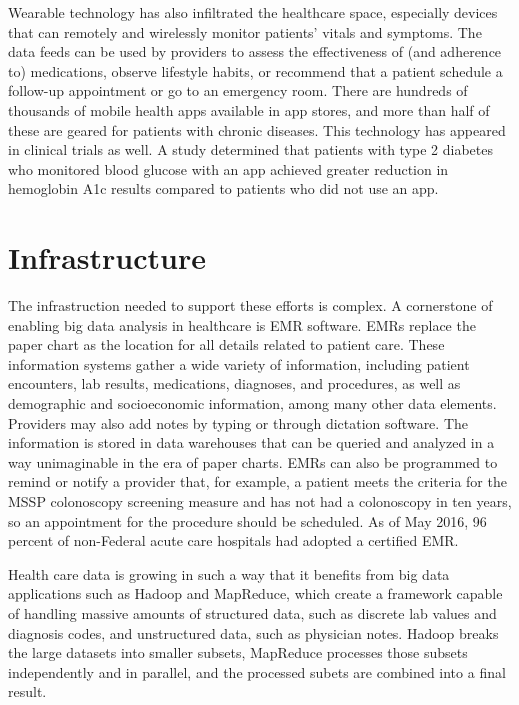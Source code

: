 \documentclass[sigconf]{acmart}
\begin{document}
 Wearable technology has also infiltrated the healthcare space, especially devices that can remotely and wirelessly monitor patients' vitals and symptoms. The data feeds can be used by providers to assess the effectiveness of (and adherence to) medications, observe lifestyle habits, or recommend that a patient schedule a follow-up appointment or go to an emergency room\cite{editor09}. There are hundreds of thousands of mobile health apps available in app stores, and more than half of these are geared for patients with chronic diseases\cite{editor09}. This technology has appeared in clinical trials as well. A study determined that patients with type 2 diabetes who monitored blood glucose with an app achieved greater reduction in hemoglobin A1c results compared to patients who did not use an app\cite{editor10}.

\section{Infrastructure}

 The infrastruction needed to support these efforts is complex. A cornerstone of enabling big data analysis in healthcare is EMR software. EMRs replace the paper chart as the location for all details related to patient care. These information systems gather a wide variety of information, including patient encounters, lab results, medications, diagnoses, and procedures, as well as demographic and socioeconomic information, among many other data elements. Providers may also add notes by typing or through dictation software. The information is stored in data warehouses that can be queried and analyzed in a way unimaginable in the era of paper charts. EMRs can also be programmed to remind or notify a provider that, for example, a patient meets the criteria for the MSSP colonoscopy screening measure and has not had a colonoscopy in ten years, so an appointment for the procedure should be scheduled. As of May 2016, 96 percent of non-Federal acute care hospitals had adopted a certified EMR\cite{editor15}.

 Health care data is growing in such a way that it benefits from  big data applications such as Hadoop and MapReduce, which create a framework capable of handling massive amounts of structured data, such as discrete lab values and diagnosis codes, and unstructured data, such as physician notes. Hadoop breaks the large datasets into smaller subsets, MapReduce processes those subsets independently and in parallel, and the processed subets are combined into a final result\cite{editor13}.
\end{document}

